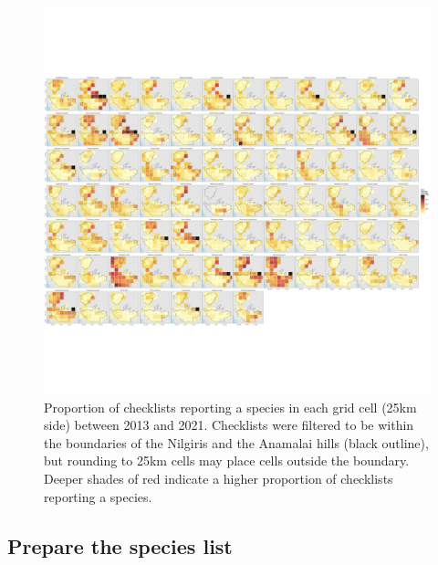 \documentclass[
]{article}
\newenvironment{Shaded}{}{}
\newcommand{\CommentTok}[1]{\textcolor[rgb]{0.00,0.50,0.00}{#1}}
\newcommand{\DataTypeTok}[1]{#1}
\newcommand{\KeywordTok}[1]{\textcolor[rgb]{0.00,0.00,1.00}{#1}}
\newcommand{\NormalTok}[1]{#1}
\newcommand{\StringTok}[1]{\textcolor[rgb]{0.00,0.50,0.50}{#1}}
\begin{document}
\begin{figure}
\centering
\includegraphics{figs/fig_species_prop_checklists_25kmgrids.png}
\caption{Proportion of checklists reporting a species in each grid cell (25km side) between 2013 and 2021. Checklists were filtered to be within the boundaries of the Nilgiris and the Anamalai hills (black outline), but rounding to 25km cells may place cells outside the boundary. Deeper shades of red indicate a higher proportion of checklists reporting a species.}
\end{figure}

\hypertarget{prepare-the-species-list}{%
\subsection{Prepare the species list}\label{prepare-the-species-list}}

\begin{Shaded}
\end{Shaded}
\end{document}
